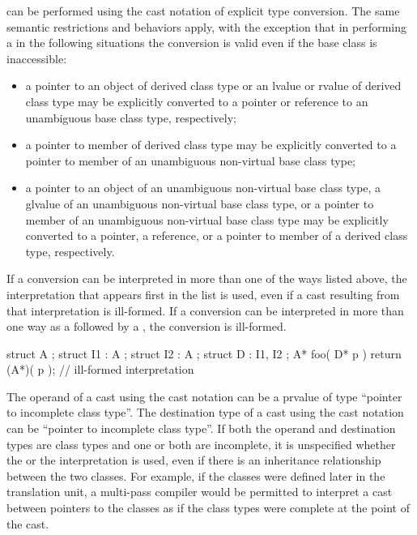 can be performed using the cast notation of explicit type conversion.
The same semantic restrictions and behaviors apply, with the exception
that in performing a  in the following situations the
conversion is valid even if the base class is inaccessible:

\begin{itemize}
\item a pointer to an object of derived class type or an lvalue or
rvalue of derived class type may be explicitly converted to a pointer or
reference to an unambiguous base class type, respectively;

\item a pointer to member of derived class type may be explicitly
converted to a pointer to member of an unambiguous non-virtual base
class type;

\item a pointer to an object of an unambiguous non-virtual base class
type, a glvalue of an unambiguous non-virtual base class type,
or a pointer to member of an unambiguous non-virtual base class type may
be explicitly converted to a pointer, a reference, or a pointer to
member of a derived class type, respectively.
\end{itemize}

If a conversion can be interpreted in more than one of the ways listed
above, the interpretation that appears first in the list is used, even
if a cast resulting from that interpretation is ill-formed. If a
conversion can be interpreted in more than one way as a
 followed by a , the conversion is
ill-formed.
\enterexample 

\begin{codeblock}
struct A { };
struct I1 : A { };
struct I2 : A { };
struct D : I1, I2 { };
A* foo( D* p ) {
  return (A*)( p ); // ill-formed  interpretation
}
\end{codeblock}
\exitexample 

\pnum
{}%
The operand of a cast using the cast notation can be a prvalue of type
``pointer to incomplete class type''. The destination type of a cast
using the cast notation can be ``pointer to incomplete class type''. If
both the operand and destination types are class types and one or both
are incomplete, it is unspecified whether the  or the
 interpretation is used, even if there is an
inheritance relationship between the two classes.
\enternote
For example, if the classes were defined later in the translation unit,
a multi-pass compiler would be permitted to interpret a cast between
pointers to the classes as if the class types were complete at the point
of the cast.
\exitnote%

